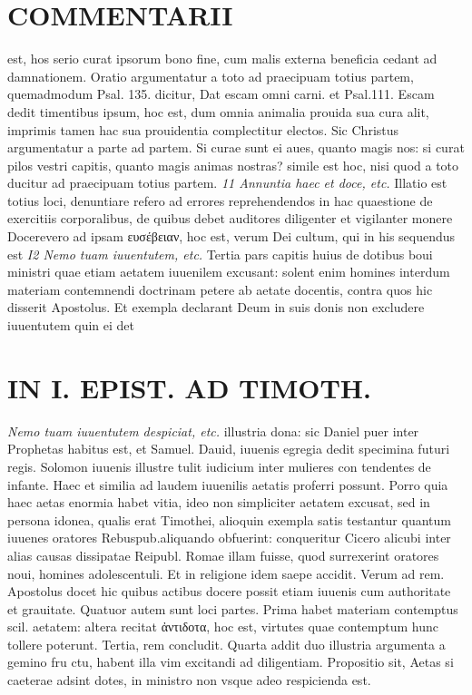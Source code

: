 \documentclass{article}
\begin{document}
\begin{pages}
\section*{COMMENTARII }
\marginpar{[ p.104 ]}\pstart est, hos serio curat ipsorum bono fine, cum malis externa beneficia cedant ad damnationem. Oratio argumentatur a toto ad praecipuam totius partem, quemadmodum Psal. 135. dicitur, Dat escam omni carni. et Psal.111. Escam dedit timentibus ipsum, hoc est, dum omnia animalia prouida sua cura alit, imprimis tamen hac sua prouidentia complectitur electos. Sic Christus argumentatur a parte ad partem. Si curae sunt ei aues, quanto magis nos: si curat pilos vestri capitis, quanto magis animas nostras? simile est hoc, nisi quod a toto ducitur ad praecipuam totius partem.  \pend
\textit{11 Annuntia haec et doce, etc. }\pstart Illatio est totius loci, denuntiare refero ad errores reprehendendos in hac quaestione de exercitiis corporalibus, de quibus debet auditores diligenter et vigilanter monere  \pend\pstart Docerevero ad ipsam ευσέβειαν, hoc est, verum Dei cultum, qui in his sequendus est  \pend
\textit{I2 Nemo tuam iuuentutem, etc. }\pstart Tertia pars capitis huius de dotibus boui ministri quae etiam aetatem iuuenilem excusant: solent enim homines interdum materiam contemnendi doctrinam petere ab aetate docentis, contra quos hic disserit Apostolus. Et exempla declarant Deum in suis donis non excludere iuuentutem quin ei det  \pend
\section*{IN I. EPIST. AD TIMOTH. }
\marginpar{[ p.105 ]}
\textit{Nemo tuam iuuentutem despiciat, etc. }\pstart illustria dona: sic Daniel puer inter Prophetas habitus est, et Samuel. Dauid, iuuenis egregia dedit specimina futuri regis. Solomon iuuenis illustre tulit iudicium inter mulieres con tendentes de infante. Haec et similia ad laudem iuuenilis aetatis proferri possunt. Porro quia haec aetas enormia habet vitia, ideo non simpliciter aetatem excusat, sed in persona idonea, qualis erat Timothei, alioquin exempla satis testantur quantum iuuenes oratores Rebuspub.aliquando obfuerint: conqueritur Cicero alicubi inter alias causas dissipatae Reipubl. Romae illam fuisse, quod surrexerint oratores noui, homines adolescentuli. Et in religione idem saepe accidit.  \pend\pstart Verum ad rem. Apostolus docet hic quibus actibus docere possit etiam iuuenis cum authoritate et grauitate. Quatuor autem sunt loci partes. Prima habet materiam contemptus scil. aetatem: altera recitat ἀντιδοτα, hoc est, virtutes quae contemptum hunc tollere poterunt. Tertia, rem concludit. Quarta addit duo illustria argumenta a gemino fru ctu, habent illa vim excitandi ad diligentiam.  \pend\pstart Propositio sit, Aetas si caeterae adsint dotes, in ministro non vsque adeo respicienda est.  \pend

\end{pages}
\end{document}
